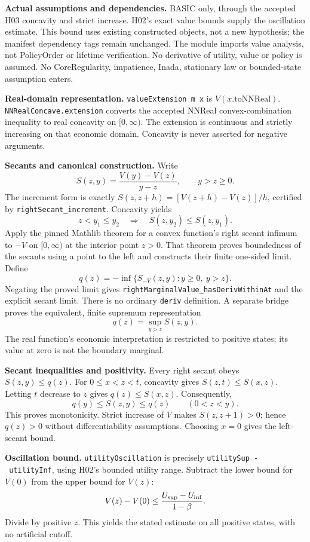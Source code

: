 \documentclass[
  11pt,
]{article}
\let\LedgerOriginalTexttt\texttt
\renewcommand{\texttt}[1]{{\small\LedgerOriginalTexttt{#1}}}
\begin{document}
\textbf{Actual assumptions and dependencies.} BASIC only, through the
accepted H03 concavity and strict increase. H02's exact value bounds
supply the oscillation estimate. This bound uses existing constructed
objects, not a new hypothesis; the manifest dependency tags remain
unchanged. The module imports value analysis, not PolicyOrder or
lifetime verification. No derivative of utility, value or policy is
assumed. No CoreRegularity, impatience, Inada, stationary law or
bounded-state assumption enters.

\textbf{Real-domain representation.} \texttt{valueExtension\ m\ x} is
\(V(x.\mathrm{toNNReal})\). \texttt{NNRealConcave.extension} converts
the accepted NNReal convex-combination inequality to real concavity on
\([0,\infty)\). The extension is continuous and strictly increasing on
that economic domain. Concavity is never asserted for negative
arguments.

\textbf{Secants and canonical construction.} Write
\[S(z,y)=\frac{V(y)-V(z)}{y-z},\qquad y>z\geq0.\] The increment form is
exactly \(S(z,z+h)=[V(z+h)-V(z)]/h\), certified by
\texttt{rightSecant\_increment}. Concavity yields
\[z<y_1\leq y_2\quad\Longrightarrow\quad S(z,y_2)\leq S(z,y_1).\] Apply
the pinned Mathlib theorem for a convex function's right secant infimum
to \(-V\) on \([0,\infty)\) at the interior point \(z>0\). That theorem
proves boundedness of the secants using a point to the left and
constructs their finite one-sided limit. Define
\[q(z)=-\inf\{S_{-V}(z,y):y\geq0,\ y>z\}.\] Negating the proved limit
gives \texttt{rightMarginalValue\_hasDerivWithinAt} and the explicit
secant limit. There is no ordinary \texttt{deriv} definition. A separate
bridge proves the equivalent, finite supremum representation
\[q(z)=\sup_{y>z}S(z,y).\] The real function's economic interpretation
is restricted to positive states; its value at zero is not the boundary
marginal.

\textbf{Secant inequalities and positivity.} Every right secant obeys
\(S(z,y)\leq q(z)\). For \(0\leq x<z<t\), concavity gives
\(S(z,t)\leq S(x,z)\). Letting \(t\) decrease to \(z\) gives
\(q(z)\leq S(x,z)\). Consequently,
\[q(y)\leq S(z,y)\leq q(z)\qquad(0<z<y).\] This proves monotonicity.
Strict increase of \(V\) makes \(S(z,z+1)>0\); hence \(q(z)>0\) without
differentiability assumptions. Choosing \(x=0\) gives the left-secant
bound.

\textbf{Oscillation bound.} \texttt{utilityOscillation} is precisely
\texttt{utilitySup\ -\ utilityInf}, using H02's bounded utility range.
Subtract the lower bound for \(V(0)\) from the upper bound for \(V(z)\):
\[V(z)-V(0)\leq\frac{U_{\rm sup}-U_{\rm inf}}{1-\beta}.\] Divide by
positive \(z\). This yields the stated estimate on all positive states,
with no artificial cutoff.
\end{document}
